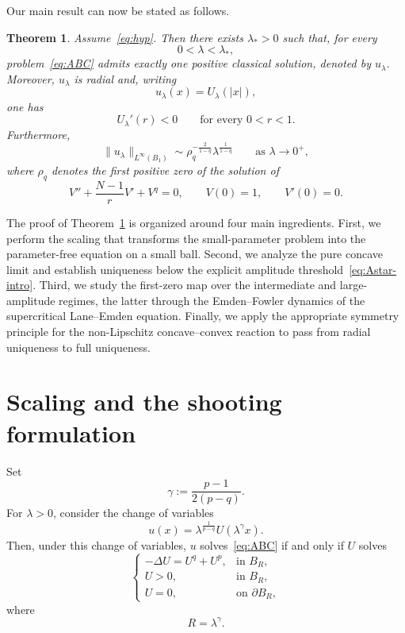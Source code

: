 \documentclass[11pt]{article}
\newtheorem{theorem}{Theorem}[section]
\theoremstyle{definition}
\begin{document}
Our main result can now be stated as follows.

\begin{theorem}
\label{thm:main}
Assume~\eqref{eq:hyp}. Then there exists $\lambda_*>0$ such that,
for every
\[
0<\lambda<\lambda_*,
\]
problem~\eqref{eq:ABC} admits exactly one positive classical solution,
denoted by $u_\lambda$. Moreover, $u_\lambda$ is radial and, writing
\[
u_\lambda(x)=U_\lambda(|x|),
\]
one has
\[
U_\lambda'(r)<0
\qquad
\text{for every }0<r<1.
\]
Furthermore,
\[
\|u_\lambda\|_{L^\infty(B_1)}
\sim
\rho_q^{-\frac{2}{1-q}}
\lambda^{\frac1{1-q}}
\qquad
\text{as }\lambda\to0^+,
\]
where $\rho_q$ denotes the first positive zero of the solution of
\[
V''
+\frac{N-1}{r}V'
+V^q=0,
\qquad
V(0)=1,
\qquad
V'(0)=0.
\]
\end{theorem}

The proof of Theorem~\ref{thm:main} is organized around four main
ingredients. First, we perform the scaling that transforms the
small-parameter problem into the parameter-free equation on a small
ball. Second, we analyze the pure concave limit and establish
uniqueness below the explicit amplitude threshold~\eqref{eq:Astar-intro}.
Third, we study the first-zero map over the intermediate and
large-amplitude regimes, the latter through the Emden--Fowler
dynamics of the supercritical Lane--Emden equation. Finally, we apply
the appropriate symmetry principle for the non-Lipschitz
concave--convex reaction to pass from radial uniqueness to full
uniqueness.


\section{Scaling and the shooting formulation}

Set
\begin{equation}
\label{eq:gamma}
\gamma
:=
\frac{p-1}{2(p-q)}.
\end{equation}
For $\lambda>0$, consider the change of variables
\begin{equation}
\label{eq:scaling}
u(x)
=
\lambda^{\frac1{p-q}}
U\!\left(\lambda^\gamma x\right).
\end{equation}
Then, under this change of variables, $u$ solves~\eqref{eq:ABC}
if and only if $U$ solves
\begin{equation}
\label{eq:scaled}
\begin{cases}
-\Delta U=U^q+U^p,
&\text{in }B_R,\\
U>0,
&\text{in }B_R,\\
U=0,
&\text{on }\partial B_R,
\end{cases}
\end{equation}
where
\begin{equation}
\label{eq:Rlambda}
R=\lambda^\gamma.
\end{equation}
\end{document}
